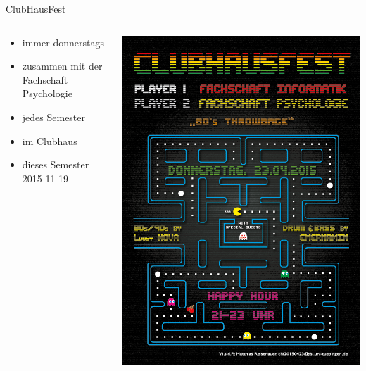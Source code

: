 \documentclass{beamer}
\begin{document}
	\begin{frame}{ClubHausFest}
		\begin{columns}
			\begin{column}{.5\linewidth}
				\begin{itemize}
					\item immer donnerstags
					\item zusammen mit der Fachschaft Psychologie
					\item jedes Semester
					\item im Clubhaus
					\item dieses Semester 2015-11-19
				\end{itemize}
			\end{column}
			\begin{column}{.5\linewidth}
				\includegraphics[width=\linewidth]{CHF_Flyer.png}
			\end{column}
		\end{columns}
	\end{frame}
	
\end{document}
